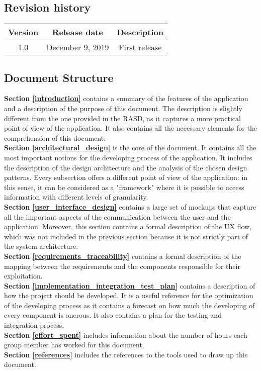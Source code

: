 \documentclass[./main.tex]{subfiles}
\begin{document}
\subsection{Revision history}

\begin{table}[H]
\centering
\begin{tabular}{|c|c|c|}
\hline
Version & Release date & Description\tabularnewline
\hline
1.0 & December 9, 2019 & First release\tabularnewline
\hline
\end{tabular}
\end{table}

\subsection{Document Structure}

\textbf{Section \ref{introduction}} contains a summary of the features of the
application and a description of the purpose of this document. The description
is slightly different from the one provided in the RASD, as it captures a more
practical point of view of the application. It also contains all the necessary
elements for the comprehension of this document.
\medskip\\
\textbf{Section \ref{architectural_design}} is the core of the document. It
contains all the most important notions for the developing process of the
application. It includes the description of the design architecture and the
analysis of the chosen design patterns. Every subsection offers a different
point of view of the application: in this sense, it can be considered as a
"framework" where it is possible to access information with different levels of
granularity.
\medskip\\
\textbf{Section \ref{user_interface_design}} contains a large set of mockups
that capture all the important aspects of the communication between the user
and the application. Moreover, this section contains a formal description of
the UX flow, which was not included in the previous section because it is not
strictly part of the system architecture.
\medskip\\
\textbf{Section \ref{requirements_traceability}} contains a formal description
of the mapping between the requirements and the components responsible for
their exploitation.
\medskip\\
\textbf{Section \ref{implementation_integration_test_plan}} contains a
description of how the project should be developed. It is a useful reference
for the optimization of the developing process as it contains a forecast on how
much the developing of every component is onerous. It also contains a plan for
the testing and integration process.
\medskip\\
\textbf{Section \ref{effort_spent}} includes information about the number of
hours each group member has worked for this document.
\medskip\\
\textbf{Section \ref{references}} includes the references to the tools used to
draw up this document.
\end{document}

